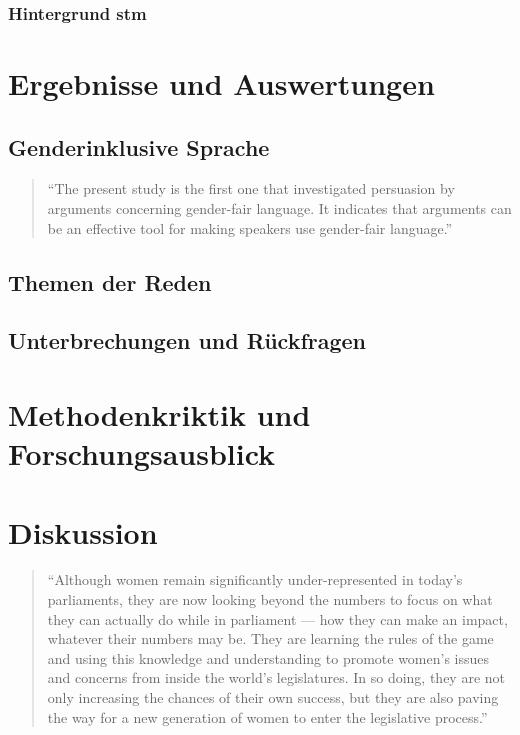 \documentclass[12pt, 
    twoside=false, 
    bibliography=totoc, 
    numbers=endperiod, 
    headings=normal, 
    toc=chapterentrydotfill
    ]{scrbook}
\begin{document}
\subsection{Hintergrund stm}

\chapter{Ergebnisse und Auswertungen}

\section{Genderinklusive Sprache}

\begin{quote}
\enquote {The present study is the first one that investigated persuasion by arguments concerning gender-fair language. It indicates that arguments can be an effective tool for making speakers use gender-fair language.} \parencite[556]{koeser_2014}
\end{quote} 

\section{Themen der Reden}

\section{Unterbrechungen und Rückfragen}

\chapter{Methodenkriktik und Forschungsausblick}

\chapter{Diskussion}

\begin{quote}
    
\enquote{Although women remain significantly under-represented in today’s parliaments, they are now looking beyond the numbers to focus on what they can actually do while in parliament — how they can make an impact, whatever their numbers may be. They are learning the rules of the game and using this knowledge and understanding to promote women’s issues and concerns from inside the world’s legislatures. In so doing, they are not only increasing the chances of their own success, but they are also paving the way for a new generation of women to enter the legislative process.} \parencite[3]{lovenduski_2015}
\end{quote}

\printbibliography[title={Literaturverzeichnis}]
\end{document}
